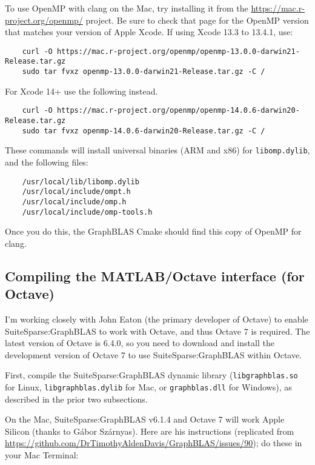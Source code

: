 \documentclass[12pt]{article}
\begin{document}
To use OpenMP with clang on the Mac, try installing it from the 
    \url{https://mac.r-project.org/openmp/} project.
Be sure to check that page for the OpenMP version
that matches your version of Apple Xcode.
If using Xcode 13.3 to 13.4.1, use:

    {\scriptsize
    \begin{verbatim}
    curl -O https://mac.r-project.org/openmp/openmp-13.0.0-darwin21-Release.tar.gz
    sudo tar fvxz openmp-13.0.0-darwin21-Release.tar.gz -C /
    \end{verbatim} }


For Xcode 14+ use the following instead.

    {\scriptsize
    \begin{verbatim}
    curl -O https://mac.r-project.org/openmp/openmp-14.0.6-darwin20-Release.tar.gz
    sudo tar fvxz openmp-14.0.6-darwin20-Release.tar.gz -C /
    \end{verbatim} }

These commands will install universal binaries (ARM and x86) for
\verb'libomp.dylib', and the following files:

    {\scriptsize
    \begin{verbatim}
    /usr/local/lib/libomp.dylib
    /usr/local/include/ompt.h
    /usr/local/include/omp.h
    /usr/local/include/omp-tools.h
    \end{verbatim} }


Once you do this, the GraphBLAS Cmake should find this copy of OpenMP
for clang.

\subsection{Compiling the MATLAB/Octave interface (for Octave)}
\label{gbmake}

I'm working closely with John Eaton (the primary developer of Octave) to
enable SuiteSparse:GraphBLAS to work with Octave, and thus Octave 7 is
required.  The latest version of Octave is 6.4.0, so you need to download and
install the development version of Octave 7 to use SuiteSparse:GraphBLAS within
Octave.

First, compile the SuiteSparse:GraphBLAS dynamic library
(\verb'libgraphblas.so' for Linux, \verb'libgraphblas.dylib' for Mac,
or \verb'graphblas.dll' for Windows), as described in the prior two
subsections.

On the Mac, SuiteSparse:GraphBLAS v6.1.4 and Octave 7 will work
Apple Silicon (thanks to G{\'{a}}bor Sz{\'{a}}rnyas).  Here are his instructions
(replicated from
\url{https://github.com/DrTimothyAldenDavis/GraphBLAS/issues/90}); do
these in your Mac Terminal:
\end{document}
